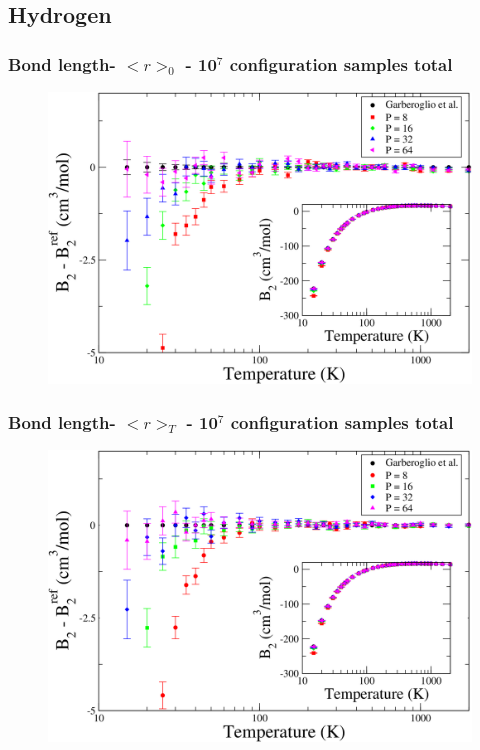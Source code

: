 \documentclass[xcolor=svgnames]{beamer}
\begin{document}
        \subsection{Hydrogen}
            \begin{frame}
                \frametitle{Bond length- $< r >_0$ - 10$^7$ configuration samples total}
                \begin{figure}
                    \centering
                    \includegraphics[scale=0.18,keepaspectratio]{s1GarberoglioAll.png}
                \end{figure}
            \end{frame}
            \begin{frame}
                \frametitle{Bond length- $< r >_T$ - 10$^7$ configuration samples total}
                \begin{figure}
                    \centering
                    \includegraphics[scale=0.18,keepaspectratio]{s2GarberoglioAll.png}
                \end{figure}
            \end{frame}
\end{document}
